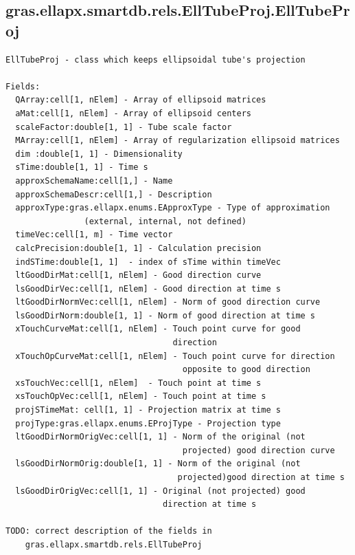 \documentclass[letterpaper,10pt,english]{sphinxmanual}
\begin{document}
\subsection{gras.ellapx.smartdb.rels.EllTubeProj.EllTubeProj}
\label{chap_functions:gras-ellapx-smartdb-rels-elltubeproj-elltubeproj}
\begin{Verbatim}[commandchars=\\\{\}]
EllTubeProj - class which keeps ellipsoidal tube's projection

Fields:
  QArray:cell[1, nElem] - Array of ellipsoid matrices
  aMat:cell[1, nElem] - Array of ellipsoid centers
  scaleFactor:double[1, 1] - Tube scale factor
  MArray:cell[1, nElem] - Array of regularization ellipsoid matrices
  dim :double[1, 1] - Dimensionality
  sTime:double[1, 1] - Time s
  approxSchemaName:cell[1,] - Name
  approxSchemaDescr:cell[1,] - Description
  approxType:gras.ellapx.enums.EApproxType - Type of approximation
                (external, internal, not defined)
  timeVec:cell[1, m] - Time vector
  calcPrecision:double[1, 1] - Calculation precision
  indSTime:double[1, 1]  - index of sTime within timeVec
  ltGoodDirMat:cell[1, nElem] - Good direction curve
  lsGoodDirVec:cell[1, nElem] - Good direction at time s
  ltGoodDirNormVec:cell[1, nElem] - Norm of good direction curve
  lsGoodDirNorm:double[1, 1] - Norm of good direction at time s
  xTouchCurveMat:cell[1, nElem] - Touch point curve for good
                                  direction
  xTouchOpCurveMat:cell[1, nElem] - Touch point curve for direction
                                    opposite to good direction
  xsTouchVec:cell[1, nElem]  - Touch point at time s
  xsTouchOpVec:cell[1, nElem] - Touch point at time s
  projSTimeMat: cell[1, 1] - Projection matrix at time s
  projType:gras.ellapx.enums.EProjType - Projection type
  ltGoodDirNormOrigVec:cell[1, 1] - Norm of the original (not
                                    projected) good direction curve
  lsGoodDirNormOrig:double[1, 1] - Norm of the original (not
                                   projected)good direction at time s
  lsGoodDirOrigVec:cell[1, 1] - Original (not projected) good
                                direction at time s

TODO: correct description of the fields in
    gras.ellapx.smartdb.rels.EllTubeProj
\end{Verbatim}
\end{document}
